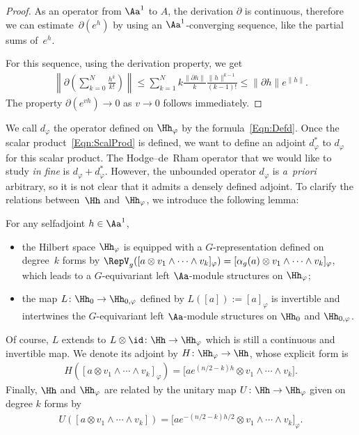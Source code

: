 \begin{proof}
As an operator from $\Aa^1$ to $A$, the derivation $\partial $ is continuous, therefore we can estimate~$\partial (e^h)$ by using an $\Aa^1$-converging sequence, like the partial sums of~$e^{h}$.

For this sequence, using the derivation property, we get
\begin{gather*}
\left\| \partial \left( \sum_{k=0}^N \frac{h^k}{k !} \right) \right\| \leqslant \sum_{k=1}^N k \frac{\| \partial h \| }{k} \frac{\| h \|^{k-1}}{(k-1)!} \leqslant \| \partial h \| e^{\| h \|}.
\end{gather*}
The property $\partial (e^{v h}) \to 0$ as $v \to 0$ follows immediately.
\end{proof}

We call $d_\varphi$ the operator def\/ined on $\Hh_\varphi$ by the formula~\eqref{Eqn:Defd}. Once the scalar product~\eqref{Eqn:ScalProd} is def\/ined, we want to def\/ine an adjoint $d^*_\varphi$ to $d_\varphi$ for this scalar product. The Hodge--de~Rham operator that we would like to study \textit{in fine} is $d_\varphi + d_\varphi^*$. However, the unbounded operator $d_\varphi$ is \textit{a~priori} arbitrary, so it is not clear that it admits a densely def\/ined adjoint. To clarify the relations between~$\Hh$ and~$\Hh_\varphi$, we introduce the following lemma:
\begin{Lemma}
\label{Lem:EquivRep}
For any selfadjoint $h \in \Aa^1$,
\begin{itemize}\itemsep=0pt
\item
the Hilbert space $\Hh_{\varphi}$ is equipped with a $G$-representation defined on degree~$k$ forms by $\RepV_g( [a \otimes v_1 \wedge \cdots \wedge v_k]_\varphi) = [\alpha_g(a) \otimes v_1 \wedge \cdots \wedge v_k]_\varphi$, which leads to a $G$-equivariant left $\Aa$-module structures on $\Hh_{\varphi}$;
\item
the map $L \colon \Hh_0 \to \Hh_{0,\varphi}$ defined by $L([a]):= [a]_\varphi$ is invertible and intertwines the $G$-equivariant left $\Aa$-module structures on $\Hh_0$ and $\Hh_{0,\varphi}$.
\end{itemize}
Of course, $L$ extends to $L \otimes \id \colon \Hh \to \Hh_\varphi$ which is still a continuous and invertible map. We denote its adjoint by $H \colon \Hh_\varphi \to \Hh$, whose explicit form is
\begin{gather*}
H( [a \otimes v_1 \wedge \cdots \wedge v_k]_\varphi ) =\big [a e^{(n/2-k)h} \otimes v_1 \wedge \cdots \wedge v_k\big].
\end{gather*}
Finally, $\Hh$ and $\Hh_\varphi$ are related by the unitary map $U \colon \Hh \to \Hh_\varphi$ given on degree $k$ forms by
\begin{gather*}
U( [a \otimes v_1 \wedge \cdots \wedge v_k] ) = \big[a e^{-(n/2-k)h/2} \otimes v_1 \wedge \cdots \wedge v_k\big]_\varphi.
\end{gather*}
\end{Lemma}

